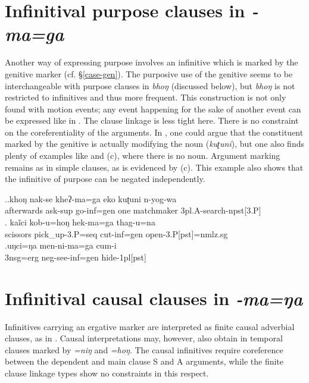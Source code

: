 \section{Infinitival purpose clauses in \emph{-ma=ga}}\label{maga}

Another way of expressing purpose involves an infinitive which is marked by the genitive marker (cf. §\ref{case-gen}). The purposive use of the genitive seems to be interchangeable with purpose clauses in \emph{bhoŋ} (discussed below), but \emph{bhoŋ} is not restricted to infinitives and thus more frequent. This construction is not only found with motion events; any event happening for the sake of another event can be expressed like in \Next. The clause linkage is less tight here. There is no constraint on the coreferentiality of the arguments. In \Next[a], one could argue that the constituent marked by the genitive is actually modifying the noun (\emph{kuʈuni}), but one also finds plenty of examples like \Next[b] and (c), where there is no noun. Argument marking remains as in simple clauses, as is evidenced by (c). This example also shows that the infinitive of purpose can be negated independently.

\ex.\ag.khoŋ nak-se kheʔ-ma=ga eko kuʈuni n-yog-wa\\
afterwards ask{\sc -sup}  go{\sc -inf=gen} one matchmaker {\sc 3pl.A-}search{\sc -npst[3.P]}\\
 
\bg. kaĩci kob-u=hoŋ hek-ma=ga thag-u=na\\
scissors   pick\_up{\sc -3.P=seq} cut{\sc -inf=gen} open{\sc -3.P[pst]=nmlz.sg}\\
  
\bg.uŋci=ŋa men-ni-ma=ga cum-i\\
{\sc 3nsg=erg} {\sc neg-}see{\sc -inf=gen} hide{\sc -1pl[pst]}\\
		
		
\section{Infinitival causal clauses in \emph{-ma=ŋa}}\label{manga}

Infinitives carrying an ergative marker are interpreted as finite causal adverbial clauses, as in \Next. Causal interpretations may, however, also obtain in temporal clauses marked by \emph{=niŋ} and \emph{=hoŋ}. The causal infinitives require coreference between the dependent and main clause S and A arguments, while the finite clause linkage types show no constraints in this respect.

